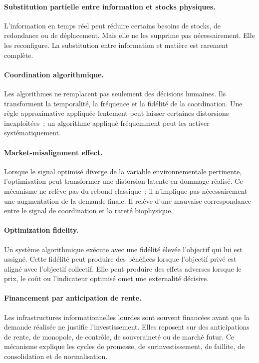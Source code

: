 \paragraph{Substitution partielle entre information et stocks physiques.}
L'information en temps réel peut réduire certains besoins de stocks, de redondance ou de déplacement. Mais elle ne les supprime pas nécessairement. Elle les reconfigure. La substitution entre information et matière est rarement complète.

\paragraph{Coordination algorithmique.}
Les algorithmes ne remplacent pas seulement des décisions humaines. Ils transforment la temporalité, la fréquence et la fidélité de la coordination. Une règle approximative appliquée lentement peut laisser certaines distorsions inexploitées~; un algorithme appliqué fréquemment peut les activer systématiquement.

\paragraph{Market-misalignment effect.}
Lorsque le signal optimisé diverge de la variable environnementale pertinente, l'optimisation peut transformer une distorsion latente en dommage réalisé. Ce mécanisme ne relève pas du rebond classique~: il n'implique pas nécessairement une augmentation de la demande finale. Il relève d'une mauvaise correspondance entre le signal de coordination et la rareté biophysique.

\paragraph{Optimization fidelity.}
Un système algorithmique exécute avec une fidélité élevée l'objectif qui lui est assigné. Cette fidélité peut produire des bénéfices lorsque l'objectif privé est aligné avec l'objectif collectif. Elle peut produire des effets adverses lorsque le prix, le coût ou l'indicateur optimisé omet une externalité décisive.

\paragraph{Financement par anticipation de rente.}
Les infrastructures informationnelles lourdes sont souvent financées avant que la demande réalisée ne justifie l'investissement. Elles reposent sur des anticipations de rente, de monopole, de contrôle, de souveraineté ou de marché futur. Ce mécanisme explique les cycles de promesse, de surinvestissement, de faillite, de consolidation et de normalisation.


